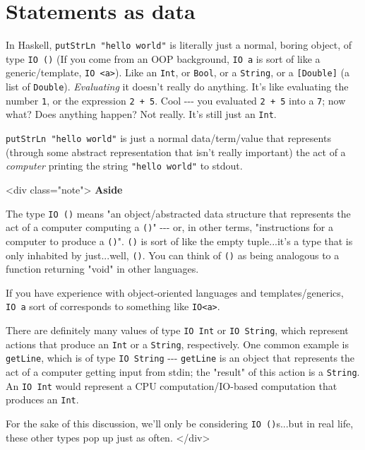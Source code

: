 \documentclass[]{article}
\begin{document}
\section{Statements as data}

In Haskell, \texttt{putStrLn\ "hello\ world"} is literally just a normal, boring
object, of type \texttt{IO\ ()} (If you come from an OOP background,
\texttt{IO\ a} is sort of like a generic/template,
\texttt{IO\ \textless{}a\textgreater{}}). Like an \texttt{Int}, or
\texttt{Bool}, or a \texttt{String}, or a \texttt{{[}Double{]}} (a list of
\texttt{Double}). \emph{Evaluating} it doesn't really do anything. It's like
evaluating the number \texttt{1}, or the expression \texttt{2\ +\ 5}. Cool
-\/-\/- you evaluated \texttt{2\ +\ 5} into a \texttt{7}; now what? Does
anything happen? Not really. It's still just an \texttt{Int}.

\texttt{putStrLn\ "hello\ world"} is just a normal data/term/value that
represents (through some abstract representation that isn't really important)
the act of a \emph{computer} printing the string \texttt{"hello\ world"} to
stdout.

\textless{}div class="note"\textgreater{} \textbf{Aside}

The type \texttt{IO\ ()} means "an object/abstracted data structure that
represents the act of a computer computing a \texttt{()}" -\/-\/- or, in other
terms, "instructions for a computer to produce a \texttt{()}". \texttt{()} is
sort of like the empty tuple...it's a type that is only inhabited by
just...well, \texttt{()}. You can think of \texttt{()} as being analogous to a
function returning "void" in other languages.

If you have experience with object-oriented languages and templates/generics,
\texttt{IO\ a} sort of corresponds to something like
\texttt{IO\textless{}a\textgreater{}}.

There are definitely many values of type \texttt{IO\ Int} or
\texttt{IO\ String}, which represent actions that produce an \texttt{Int} or a
\texttt{String}, respectively. One common example is \texttt{getLine}, which is
of type \texttt{IO\ String} -\/-\/- \texttt{getLine} is an object that
represents the act of a computer getting input from stdin; the "result" of this
action is a \texttt{String}. An \texttt{IO\ Int} would represent a CPU
computation/IO-based computation that produces an \texttt{Int}.

For the sake of this discussion, we'll only be considering
\texttt{IO\ ()}s...but in real life, these other types pop up just as often.
\textless{}/div\textgreater{}
\end{document}
